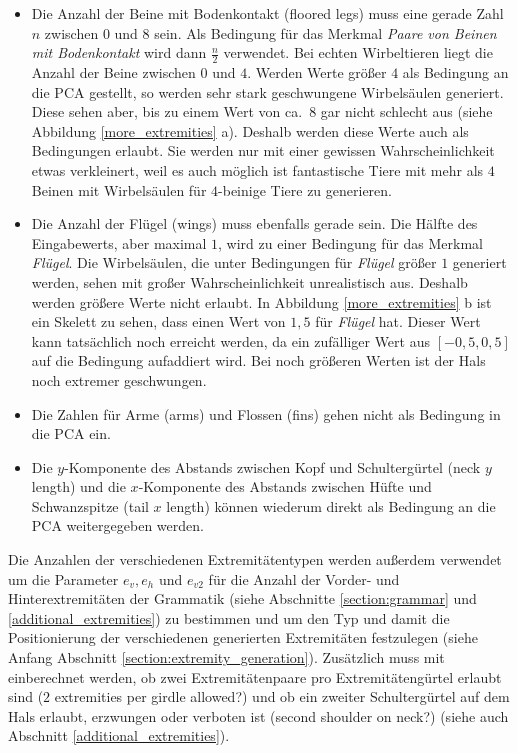 \begin{itemize}
 \item Die Anzahl der Beine mit Bodenkontakt (floored legs) muss eine gerade Zahl $n$ zwischen $0$ und $8$ sein. Als Bedingung für das Merkmal \emph{Paare von Beinen mit Bodenkontakt} wird dann $\frac{n}{2}$ verwendet. Bei echten Wirbeltieren liegt die Anzahl der Beine zwischen $0$ und $4$. Werden Werte größer $4$ als Bedingung an die PCA gestellt, so werden sehr stark geschwungene Wirbelsäulen generiert. Diese sehen aber, bis zu einem Wert von ca.\ $8$ gar nicht schlecht aus (siehe Abbildung \ref{more_extremities} a). Deshalb werden diese Werte auch als Bedingungen erlaubt. Sie werden nur mit einer gewissen Wahrscheinlichkeit etwas verkleinert, weil es auch möglich ist fantastische Tiere mit mehr als $4$ Beinen mit Wirbelsäulen für $4$-beinige Tiere zu generieren.
 
 \item Die Anzahl der Flügel (wings) muss ebenfalls gerade sein. Die Hälfte des Eingabewerts, aber maximal $1$, wird zu einer Bedingung für das Merkmal \emph{Flügel}.
 Die Wirbelsäulen, die unter Bedingungen für \emph{Flügel} größer $1$ generiert werden, sehen mit großer Wahrscheinlichkeit unrealistisch aus. Deshalb werden größere Werte nicht erlaubt. In Abbildung \ref{more_extremities} b ist ein Skelett zu sehen, dass einen Wert von $1{,}5$ für \emph{Flügel} hat. Dieser Wert kann tatsächlich noch erreicht werden, da ein zufälliger Wert aus $[-0{,}5, 0{,}5]$ auf die Bedingung aufaddiert wird. Bei noch größeren Werten ist der Hals noch extremer geschwungen.
 
 \item Die Zahlen für Arme (arms) und Flossen (fins) gehen nicht als Bedingung in die PCA ein.
 
 \item Die $y$-Komponente des Abstands zwischen Kopf und Schultergürtel (neck $y$ length) und die $x$-Komponente des Abstands zwischen Hüfte und Schwanzspitze (tail $x$ length) können wiederum direkt als Bedingung an die PCA weitergegeben werden.
\end{itemize}

Die Anzahlen der verschiedenen Extremitätentypen werden außerdem verwendet um die Parameter $e_v, e_h$ und $e_{v2}$ für die Anzahl der Vorder- und Hinterextremitäten der Grammatik (siehe Abschnitte \ref{section:grammar} und \ref{additional_extremities}) zu bestimmen und um den Typ und damit die Positionierung der verschiedenen generierten Extremitäten festzulegen (siehe Anfang Abschnitt \ref{section:extremity_generation}). Zusätzlich muss mit einberechnet werden, ob zwei Extremitätenpaare pro Extremitätengürtel erlaubt sind ($2$ extremities per girdle allowed?) und ob ein zweiter Schultergürtel auf dem Hals erlaubt, erzwungen oder verboten ist (second shoulder on neck?) (siehe auch Abschnitt \ref{additional_extremities}).

